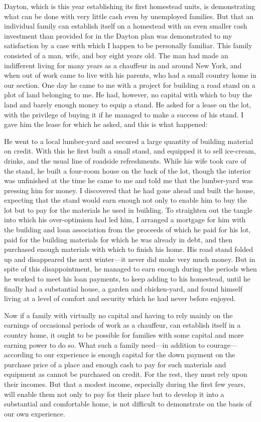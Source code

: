 \documentclass{book}
\begin{document}
Dayton, which is this year establishing its first homestead units, is demonstrating what can be done with very little cash even by unemployed families. But that an individual family can establish itself on a homestead with an even smaller cash investment than provided for in the Dayton plan was demonstrated to my satisfaction by a case with which I happen to be personally familiar. This family consisted of a man, wife, and boy eight years old. The man had made an indifferent living for many years as a chauffeur in and around New York, and when out of work came to live with his parents, who had a small country home in our section. One day he came to me with a project for building a road stand on a plot of land belonging to me. He had, however, no capital with which to buy the land and barely enough money to equip a stand. He asked for a lease on the lot, with the privilege of buying it if he managed to make a success of his stand. I gave him the lease for which he asked, and this is what happened:

He went to a local lumber-yard and secured a large quantity of building material on credit. With this he first built a small stand, and equipped it to sell ice-cream, drinks, and the usual line of roadside refreshments. While his wife took care of the stand, he built a four-room house on the back of the lot, though the interior was unfinished at the time he came to me and told me that the lumber-yard was pressing him for money. I discovered that he had gone ahead and built the house, expecting that the stand would earn enough not only to enable him to buy the lot but to pay for the materials he used in building. To straighten out the tangle into which his over-optimism had led him, I arranged a mortgage for him with the building and loan association from the proceeds of which he paid for his lot, paid for the building materials for which he was already in debt, and then purchased enough materials with which to finish his home. His road stand folded up and disappeared the next winter—it never did make very much money. But in spite of this disappointment, he managed to earn enough during the periods when he worked to meet his loan payments, to keep adding to his homestead, until he finally had a substantial house, a garden and chicken-yard, and found himself living at a level of comfort and security which he had never before enjoyed.

Now if a family with virtually no capital and having to rely mainly on the earnings of occasional periods of work as a chauffeur, can establish itself in a country home, it ought to be possible for families with some capital and more earning power to do so. What such a family need—in addition to courage—according to our experience is enough capital for the down payment on the purchase price of a place and enough cash to pay for such materials and equipment as cannot be purchased on credit. For the rest, they must rely upon their incomes. But that a modest income, especially during the first few years, will enable them not only to pay for their place but to develop it into a substantial and comfortable home, is not difficult to demonstrate on the basis of our own experience.
\end{document}
